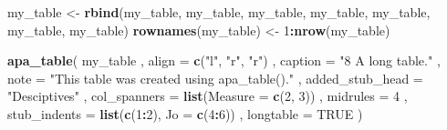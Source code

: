 \documentclass[man]{apa6}
\newenvironment{Shaded}{\begin{snugshade}}{\end{snugshade}}
\newcommand{\KeywordTok}[1]{\textcolor[rgb]{0.13,0.29,0.53}{\textbf{#1}}}
\newcommand{\DataTypeTok}[1]{\textcolor[rgb]{0.13,0.29,0.53}{#1}}
\newcommand{\DecValTok}[1]{\textcolor[rgb]{0.00,0.00,0.81}{#1}}
\newcommand{\StringTok}[1]{\textcolor[rgb]{0.31,0.60,0.02}{#1}}
\newcommand{\OtherTok}[1]{\textcolor[rgb]{0.56,0.35,0.01}{#1}}
\newcommand{\OperatorTok}[1]{\textcolor[rgb]{0.81,0.36,0.00}{\textbf{#1}}}
\newcommand{\NormalTok}[1]{#1}
\begin{document}
\begin{Shaded}
\begin{Highlighting}[]
\NormalTok{my_table <-}\StringTok{ }\KeywordTok{rbind}\NormalTok{(my_table, my_table, my_table, my_table, my_table, my_table, my_table)}
\KeywordTok{rownames}\NormalTok{(my_table) <-}\StringTok{ }\DecValTok{1}\OperatorTok{:}\KeywordTok{nrow}\NormalTok{(my_table)}

\KeywordTok{apa_table}\NormalTok{(}
\NormalTok{  my_table}
\NormalTok{  , }\DataTypeTok{align =} \KeywordTok{c}\NormalTok{(}\StringTok{"l"}\NormalTok{, }\StringTok{"r"}\NormalTok{, }\StringTok{"r"}\NormalTok{)}
\NormalTok{  , }\DataTypeTok{caption =} \StringTok{"8 A long table."}
\NormalTok{  , }\DataTypeTok{note =} \StringTok{"This table was created using apa_table()."}
\NormalTok{  , }\DataTypeTok{added_stub_head =} \StringTok{"Desciptives"}
\NormalTok{  , }\DataTypeTok{col_spanners =} \KeywordTok{list}\NormalTok{(}\DataTypeTok{Measure =} \KeywordTok{c}\NormalTok{(}\DecValTok{2}\NormalTok{, }\DecValTok{3}\NormalTok{))}
\NormalTok{  , }\DataTypeTok{midrules =} \DecValTok{4}
\NormalTok{  , }\DataTypeTok{stub_indents =} \KeywordTok{list}\NormalTok{(}\KeywordTok{c}\NormalTok{(}\DecValTok{1}\OperatorTok{:}\DecValTok{2}\NormalTok{), }\DataTypeTok{Jo =} \KeywordTok{c}\NormalTok{(}\DecValTok{4}\OperatorTok{:}\DecValTok{6}\NormalTok{))}
\NormalTok{  , }\DataTypeTok{longtable =} \OtherTok{TRUE}
\NormalTok{)}
\end{Highlighting}
\end{Shaded}
\end{document}

